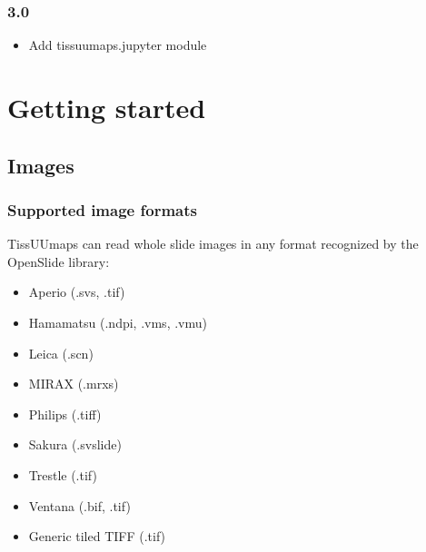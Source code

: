 \documentclass[letterpaper,10pt,english,openany,oneside]{sphinxmanual}
\begin{document}
\subsection{3.0}
\label{\detokenize{docs/intro/versions:id14}}\begin{itemize}
\item {} 
\sphinxAtStartPar
Add tissuumaps.jupyter module

\end{itemize}

\sphinxstepscope


\chapter{Getting started}
\label{\detokenize{docs/starting/index:getting-started}}\label{\detokenize{docs/starting/index::doc}}
\sphinxstepscope


\section{Images}
\label{\detokenize{docs/starting/images:images}}\label{\detokenize{docs/starting/images::doc}}

\subsection{Supported image formats}
\label{\detokenize{docs/starting/images:supported-image-formats}}
\sphinxAtStartPar
TissUUmaps can read whole slide images in any format recognized by the OpenSlide library:
\begin{itemize}
\item {} 
\sphinxAtStartPar
Aperio (.svs, .tif)

\item {} 
\sphinxAtStartPar
Hamamatsu (.ndpi, .vms, .vmu)

\item {} 
\sphinxAtStartPar
Leica (.scn)

\item {} 
\sphinxAtStartPar
MIRAX (.mrxs)

\item {} 
\sphinxAtStartPar
Philips (.tiff)

\item {} 
\sphinxAtStartPar
Sakura (.svslide)

\item {} 
\sphinxAtStartPar
Trestle (.tif)

\item {} 
\sphinxAtStartPar
Ventana (.bif, .tif)

\item {} 
\sphinxAtStartPar
Generic tiled TIFF (.tif)

\end{itemize}
\end{document}
